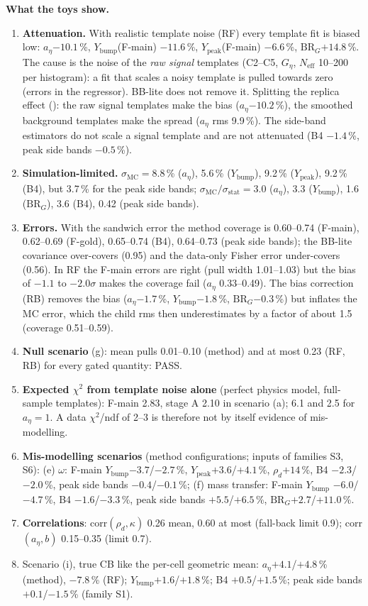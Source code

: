 \documentclass[11pt,a4paper]{article}
\newcommand{\code}[1]{\texttt{\detokenize{#1}}}
\newcommand{\aEta}{\ensuremath{a_\eta}\xspace}
\newcommand{\Ybump}{\ensuremath{Y_{\mathrm{bump}}}\xspace}
\newcommand{\Ypeak}{\ensuremath{Y_{\mathrm{peak}}}\xspace}
\newcommand{\rhod}{\ensuremath{\rho_d}\xspace}
\newcommand{\BRG}{\ensuremath{\mathrm{BR}_G}\xspace}
\newcommand{\Geta}{\ensuremath{G_\eta}\xspace}
\begin{document}
\textbf{What the toys show.}
\begin{enumerate}\setlength{\itemsep}{0pt}
\item \textbf{Attenuation.} With realistic template noise (RF) every template fit is biased low: \aEta $-10.1$\,\%, \Ybump(F-main)
      $-11.6$\,\%, \Ypeak(F-main) $-6.6$\,\%, \BRG $+14.8$\,\%. The cause is the noise of the \emph{raw signal} templates (C2--C5, \Geta,
      $N_{\mathrm{eff}}$ 10--200 per histogram): a fit that scales a noisy template is pulled towards zero (errors in the regressor).
      BB-lite does not remove it. Splitting the replica effect (\code{wp4_mcsplit.txt}): the raw signal templates make the bias
      (\aEta $-10.2$\,\%), the smoothed background templates make the spread (\aEta rms 9.9\,\%). The side-band estimators do not scale a
      signal template and are not attenuated (B4 $-1.4$\,\%, peak side bands $-0.5$\,\%).
\item \textbf{Simulation-limited.} $\sigma_{\mathrm{MC}}=8.8$\,\% (\aEta), 5.6\,\% (\Ybump), 9.2\,\% (\Ypeak), 9.2\,\% (B4), but 3.7\,\% for
      the peak side bands; $\sigma_{\mathrm{MC}}/\sigma_{\mathrm{stat}}=3.0$ (\aEta), 3.3 (\Ybump), 1.6 (\BRG), 3.6 (B4), 0.42 (peak side bands).
\item \textbf{Errors.} With the sandwich error the method coverage is 0.60--0.74 (F-main), 0.62--0.69 (F-gold), 0.65--0.74 (B4), 0.64--0.73
      (peak side bands); the BB-lite covariance over-covers (0.95) and the data-only Fisher error under-covers (0.56). In RF the F-main
      errors are right (pull width 1.01--1.03) but the bias of $-1.1$ to $-2.0\sigma$ makes the coverage fail (\aEta 0.33--0.49). The bias
      correction (RB) removes the bias (\aEta $-1.7$\,\%, \Ybump $-1.8$\,\%, \BRG $-0.3$\,\%) but inflates the MC error, which the child rms
      then underestimates by a factor of about 1.5 (coverage 0.51--0.59).
\item \textbf{Null scenario} (g): mean pulls 0.01--0.10 (method) and at most 0.23 (RF, RB) for every gated quantity: PASS.
\item \textbf{Expected $\chi^2$ from template noise alone} (perfect physics model, full-sample templates): F-main 2.83, stage A 2.10 in
      scenario (a); 6.1 and 2.5 for $\aEta=1$. A data $\chi^2$/ndf of 2--3 is therefore not by itself evidence of mis-modelling.
\item \textbf{Mis-modelling scenarios} (method configurations; inputs of families S3, S6): (e) $\omega$: F-main \Ybump $-3.7$/$-2.7$\,\%,
      \Ypeak $+3.6$/$+4.1$\,\%, \rhod $+14$\,\%, B4 $-2.3$/$-2.0$\,\%, peak side bands $-0.4$/$-0.1$\,\%; (f) mass transfer: F-main \Ybump
      $-6.0$/$-4.7$\,\%, B4 $-1.6$/$-3.3$\,\%, peak side bands $+5.5$/$+6.5$\,\%, \BRG $+2.7$/$+11.0$\,\%.
\item \textbf{Correlations}: corr$(\rhod,\kappa)$ 0.26 mean, 0.60 at most (fall-back limit 0.9); corr$(\aEta,b)$ 0.15--0.35 (limit 0.7).
\item Scenario (i), true CB like the per-cell geometric mean: \aEta $+4.1$/$+4.8$\,\% (method), $-7.8$\,\% (RF); \Ybump $+1.6$/$+1.8$\,\%;
      B4 $+0.5$/$+1.5$\,\%; peak side bands $+0.1$/$-1.5$\,\% (family S1).
\end{enumerate}
\end{document}
